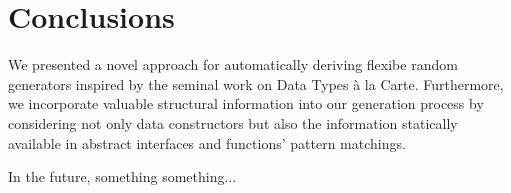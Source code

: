 \section{Conclusions}
\label{sec:conclusions}

We presented a novel approach for automatically deriving flexibe random
generators inspired by the seminal work on Data Types \`a la Carte.
%
Furthermore, we incorporate valuable structural information into our generation
process by considering not only data constructors but also the information
statically available in abstract interfaces and functions' pattern matchings.


In the future, something something...
